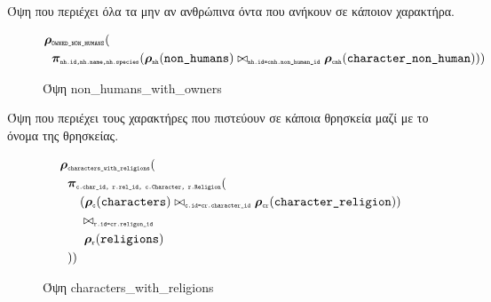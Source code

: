 \documentclass[../main.tex]{subfiles}
\begin{document}
\noindent
Όψη που περιέχει όλα τα μην αν ανθρώπινα όντα που ανήκουν σε κάποιον
χαρακτήρα.
\begin{figure}[H]
  \begin{equation}
    \begin{aligned}
      \bm{\rho}&_{\texttt{\tiny OWNED\_NON\_HUMANS}} ( \\
               & \bm{\pi}_{\texttt{\tiny nh.id,nh.name,nh.species}} (
               \bm{\rho}_{\texttt{\tiny nh}}(\texttt{non\_humans})
               \bowtie_{\texttt{\tiny nh.id=cnh.non\_human\_id}}
               \bm{\rho}_{\texttt{\tiny cnh}}(\texttt{character\_non\_human})
               ))
    \end{aligned}
  \end{equation}
  \caption{Όψη non\_humans\_with\_owners}
\end{figure}

\noindent
Όψη που περιέχει τους χαρακτήρες που πιστεύουν σε κάποια θρησκεία μαζί με το
όνομα της θρησκείας.
\begin{figure}[H]
  \begin{equation}
    \begin{aligned}
      \bm{\rho}&_{\texttt{\tiny characters\_with\_religions}} ( \\
               & \bm{\pi}_{\texttt{\tiny c.char\_id, r.rel\_id, c.Character, r.Religion}} ( \\
               & \quad(\bm{\rho}_{\texttt{\tiny c}}(\texttt{characters}) \bowtie_{\texttt{\tiny c.id=cr.character\_id}} \bm{\rho}_{\texttt{\tiny cr}}(\texttt{character\_religion})) \\
               & \quad\bowtie_{\texttt{\tiny r.id=cr.religon\_id}} \\
               & \quad\ \bm{\rho}_{\texttt{\tiny r}}(\texttt{religions})\\
               & ))
    \end{aligned}
  \end{equation}
  \caption{Όψη characters\_with\_religions}
\end{figure}
\end{document}

